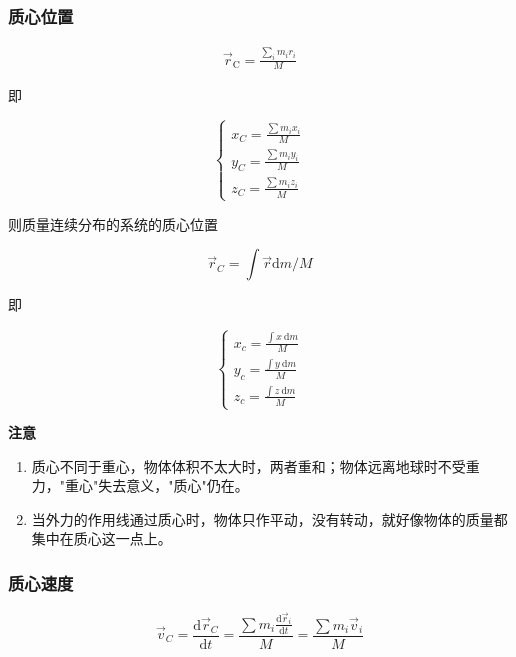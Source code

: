 \documentclass[
	12pt, %
	a4paper, %
]{myLegrandOrangeBook}
\newcommand{\rmd}{\mathrm{d}}
\begin{document}
    \subsubsection*{质心位置}

    \begin{align}
        \overrightarrow{r}_{\mathrm{C}} = \frac{\sum_{i} m_ir_i}{M}
    \end{align}

    即

    $$
        \left\{\begin{array}{l}
        x_C=\frac{\sum m_i x_i}{M} \\
        y_C=\frac{\sum m_i y_i}{M} \\
        z_C=\frac{\sum m_i z_i}{M}
        \end{array}\right.
    $$

    则质量连续分布的系统的质心位置

    $$
        \overrightarrow{r}_C=\int \overrightarrow{r} \rmd m / M
    $$

    即

    $$
        \left\{\begin{array}{l}
            x_c=\frac{\int x \mathrm{~d} m}{M} \\
            y_c=\frac{\int y \mathrm{~d} m}{M} \\
            z_c=\frac{\int z \mathrm{~d} m}{M}
        \end{array}\right.
    $$

    \textbf{注意}

    \begin{enumerate}
        \item 质心不同于重心，物体体积不太大时，两者重和；物体远离地球时不受重力，"重心"失去意义，"质心"仍在。
        \item 当外力的作用线通过质心时，物体只作平动，没有转动，就好像物体的质量都集中在质心这一点上。
    \end{enumerate}

    \subsubsection*{质心速度}

    \begin{equation}
        \overrightarrow{v}_C=\frac{\rmd \overrightarrow{r}_C}{\rmd t}=\frac{\sum m_i \frac{\rmd \overrightarrow{r}_i}{\rmd t}}{M}=\frac{\sum m_i \overrightarrow{v}_i}{M}
    \end{equation}
\end{document}
